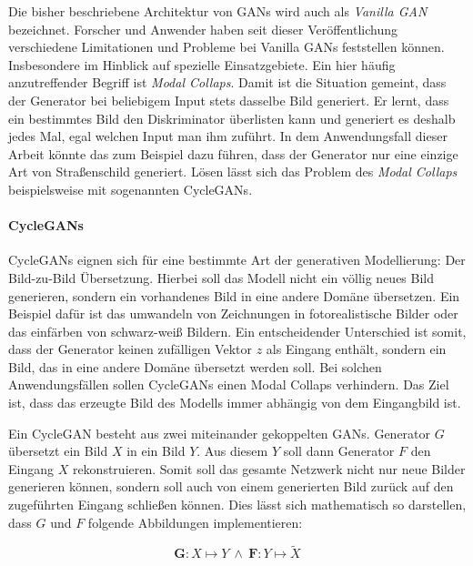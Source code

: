 Die bisher beschriebene Architektur von \acp{GAN} wird auch als \emph{Vanilla \ac{GAN}} bezeichnet. Forscher und Anwender haben seit dieser Veröffentlichung verschiedene Limitationen und Probleme bei Vanilla \acp{GAN} feststellen können. Insbesondere im Hinblick auf spezielle Einsatzgebiete. Ein hier häufig anzutreffender Begriff ist \emph{Modal Collaps}. Damit ist die Situation gemeint, dass der Generator bei beliebigem Input stets dasselbe Bild generiert. Er lernt, dass ein bestimmtes Bild den Diskriminator überlisten kann und generiert es deshalb jedes Mal, egal welchen Input man ihm zuführt. In dem Anwendungsfall dieser Arbeit könnte das zum Beispiel dazu führen, dass der Generator nur eine einzige Art von Straßenschild generiert. Lösen lässt sich das Problem des \emph{Modal Collaps} beispielsweise mit sogenannten \acp{CycleGAN}. \cite{visualApproach}

\paragraph{CycleGANs}
\acp{CycleGAN} eignen sich für eine bestimmte Art der generativen Modellierung: Der Bild-zu-Bild Übersetzung. Hierbei soll das Modell nicht ein völlig neues Bild generieren, sondern ein vorhandenes Bild in eine andere Domäne übersetzen. Ein Beispiel dafür ist das umwandeln von Zeichnungen in fotorealistische Bilder oder das einfärben von schwarz-weiß Bildern. Ein entscheidender Unterschied ist somit, dass der Generator keinen zufälligen Vektor $z$ als Eingang enthält, sondern ein Bild, das in eine andere Domäne übersetzt werden soll. Bei solchen Anwendungsfällen sollen \acp{CycleGAN} einen Modal Collaps verhindern. Das Ziel ist, dass das erzeugte Bild des Modells immer abhängig von dem Eingangbild ist. \cite{cycleGAN}

Ein \ac{CycleGAN} besteht aus zwei miteinander gekoppelten \acp{GAN}. Generator $G$ übersetzt ein Bild $X$ in ein Bild $Y$. Aus diesem $Y$ soll dann Generator $F$ den Eingang $X$ rekonstruieren. Somit soll das gesamte Netzwerk nicht nur neue Bilder generieren können, sondern soll auch von einem generierten Bild zurück auf den zugeführten Eingang schließen können. Dies lässt sich mathematisch so darstellen, dass $G$ und $F$ folgende Abbildungen implementieren: \cite{cycleGAN}

\begin{equation}
	\mathbf{G}: X\mapsto Y \: \wedge \: \mathbf{F}: Y\mapsto \tilde{X}
\end{equation}

